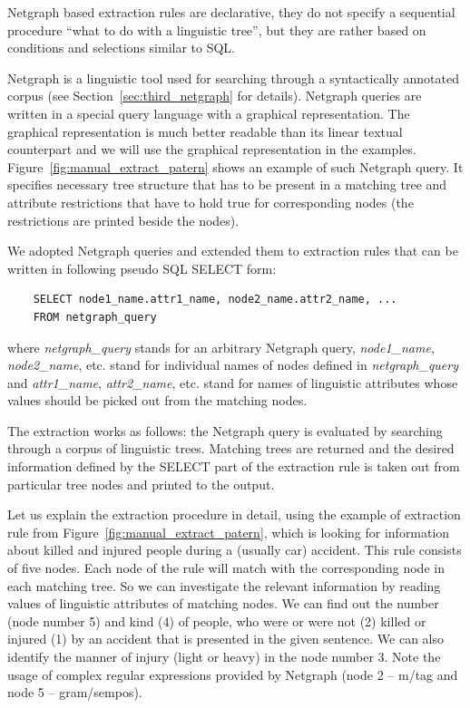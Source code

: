 Netgraph based extraction rules are declarative, they do not specify a sequential procedure ``what to do with a linguistic tree'', but they are rather based on conditions and selections similar to SQL.

Netgraph is a linguistic tool used for searching through a syntactically annotated corpus (see Section~\ref{sec:third_netgraph} for details). Netgraph queries are written in a special query language with a graphical representation. The graphical representation is much better readable than its linear textual counterpart and we will use the graphical representation in the examples. Figure~\ref{fig:manual_extract_patern} shows an example of such Netgraph query. It specifies necessary tree structure that has to be present in a matching tree and attribute restrictions that have to hold true for corresponding nodes (the restrictions are printed beside the nodes).



We adopted Netgraph queries and extended them to extraction rules that can be written in following pseudo SQL SELECT form:


\begin{verbatim}
	SELECT node1_name.attr1_name, node2_name.attr2_name, ... 
	FROM netgraph_query
\end{verbatim}

\noindent where \emph{netgraph\_query} stands for an arbitrary Netgraph query, \emph{node1\_name}, \emph{node2\_name}, etc. stand for individual names of nodes defined in \emph{netgraph\_query} and \emph{attr1\_name}, \emph{attr2\_name}, etc. stand for names of linguistic attributes whose values should be picked out from the matching nodes.

The extraction works as follows: the Netgraph query is evaluated by searching through a corpus of linguistic trees. Matching trees are returned and the desired information defined by the SELECT part of the extraction rule is taken out from particular tree nodes and printed to the output.

Let us explain the extraction procedure in detail, using the example of extraction rule from Figure~\ref{fig:manual_extract_patern}, which is looking for information about killed and injured people during a (usually car) accident. This rule consists of five nodes. Each node of the rule will match with the corresponding node in each matching tree. So we can investigate the relevant information by reading values of linguistic attributes of matching nodes. We can find out the number (node number 5) and kind (4) of people, who were or were not (2) killed or injured (1) by an accident that is presented in the given sentence. We can also identify the manner of injury (light or heavy) in the node number 3. Note the usage of complex regular expressions provided by Netgraph (node 2 -- m/tag and node 5 -- gram/sempos).

